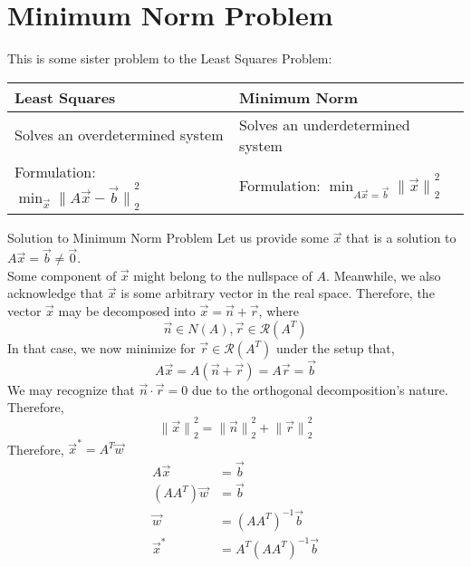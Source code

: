 \section{Minimum Norm Problem}
This is some sister problem to the Least Squares Problem:
\begin{center}
    \begin{tabular}{l || l}
        Least Squares & Minimum Norm \\
        \hline
        \hline
        Solves an overdetermined system & Solves an underdetermined system \\
        \hline
        Formulation: $\min_{\vec{x}} {\lVert A\vec{x} - \vec{b} \rVert}_2^2$ & Formulation: $\min_{A\vec{x} = \vec{b}} {\lVert \vec{x} \rVert}_2^2$
    \end{tabular}
\end{center}
\begin{ln-explain}{Solution to Minimum Norm Problem}{}
    Let us provide some $\vec{x}$ that is a solution to $A \vec{x} = \vec{b} \neq \vec{0}$. \\
    Some component of $\vec{x}$ might belong to the nullspace of $A$. Meanwhile, we also acknowledge that $\vec{x}$ is some arbitrary vector in the real space.
    Therefore, the vector $\vec{x}$ may be decomposed into $\vec{x} = \vec{n} + \vec{r}$, where 
    \[
        \vec{n} \in N(A), \vec{r} \in \mathcal{R}(A^T)
    \]
    In that case, we now minimize for $\vec{r} \in \mathcal{R}(A^T)$ under the setup that,
    \[
        A \vec{x} = A(\vec{n} + \vec{r}) = A \vec{r} = \vec{b}
    \]
    We may recognize that $\vec{n} \cdot \vec{r} = 0$ due to the orthogonal decomposition's nature. Therefore,
    \[
        {\lVert \vec{x} \rVert}_2^2 = {\lVert \vec{n} \rVert}_2^2 + {\lVert \vec{r} \rVert}_2^2
    \]
    Therefore, $\vec{x}^* = A^T \vec{w}$
    \begin{align*}
        A \vec{x} &= \vec{b} \\
        (A A^T) \vec{w} &= \vec{b} \\
        \vec{w} &= {(A A^T)}^{-1} \vec{b} \\
        \vec{x}^* &= A^T {(A A^T)}^{-1} \vec{b}
    \end{align*}
\end{ln-explain}

